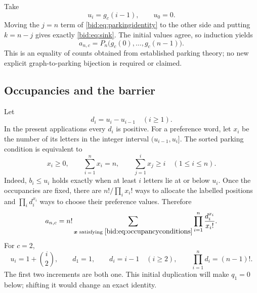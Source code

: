 \documentclass[11pt,letterpaper]{article}
\numberwithin{equation}{section}
\theoremstyle{remark}\newtheorem{remark}[theorem]{Remark}
\begin{document}
Take
\begin{equation}\label{bid:eq:parkingbounds}
 u_i=g_c(i-1),\qquad u_0=0.
\end{equation}
Moving the $j=n$ term of \eqref{bid:eq:parkingidentity} to the other side and
putting $k=n-j$ gives exactly \eqref{bid:eq:sink}. The initial values agree,
so induction yields
\begin{equation}\label{bid:eq:parkingcount}
 a_{n,c}=P_n\bigl(g_c(0),\ldots,g_c(n-1)\bigr).
\end{equation}
This is an equality of counts obtained from established parking theory;
no new explicit graph-to-parking bijection is required or claimed.

\subsection{Occupancies and the barrier}
Let
\begin{equation}\label{bid:eq:di}
 d_i=u_i-u_{i-1}\quad(i\geq1).
\end{equation}
In the present applications every $d_i$ is positive. For a preference
word, let $x_i$ be the number of its letters in the integer interval
$(u_{i-1},u_i]$. The sorted parking condition is equivalent to
\begin{equation}\label{bid:eq:occupancyconditions}
 x_i\geq0,\qquad \sum_{i=1}^n x_i=n,\qquad
 \sum_{j=1}^i x_j\geq i\quad(1\leq i\leq n).
\end{equation}
Indeed, $b_i\leq u_i$ holds exactly when at least $i$ letters lie at or
below $u_i$. Once the occupancies are fixed, there are
$n!/\prod_i x_i!$ ways to allocate the labelled positions and
$\prod_i d_i^{x_i}$ ways to choose their preference values. Therefore
\begin{equation}\label{bid:eq:occupancy}
 a_{n,c}=n!\sum_{\boldsymbol x\text{ satisfying }\eqref{bid:eq:occupancyconditions}}
                  \prod_{i=1}^n\frac{d_i^{x_i}}{x_i!}.
\end{equation}
For $c=2$,
\begin{equation}\label{bid:eq:quadraticd}
 u_i=1+\binom i2,\qquad d_1=1,\qquad d_i=i-1\quad(i\geq2),
 \qquad \prod_{i=1}^n d_i=(n-1)!.
\end{equation}
The first two increments are both one. This initial duplication will
make $q_1=0$ below; shifting it would change an exact identity.
\end{document}
